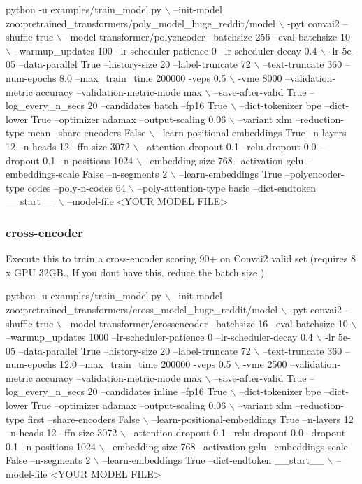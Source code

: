 \begin{DoxyCode}
python -u examples/train\_model.py \(\backslash\)
  --init-model zoo:pretrained\_transformers/poly\_model\_huge\_reddit/model \(\backslash\)
  -pyt convai2 --shuffle true \(\backslash\)
  --model transformer/polyencoder --batchsize 256 --eval-batchsize 10 \(\backslash\)
  --warmup\_updates 100 --lr-scheduler-patience 0 --lr-scheduler-decay 0.4 \(\backslash\)
  -lr 5e-05 --data-parallel True --history-size 20 --label-truncate 72 \(\backslash\)
  --text-truncate 360 --num-epochs 8.0 --max\_train\_time 200000 -veps 0.5 \(\backslash\)
  -vme 8000 --validation-metric accuracy --validation-metric-mode max \(\backslash\)
  --save-after-valid True --log\_every\_n\_secs 20 --candidates batch --fp16 True \(\backslash\)
  --dict-tokenizer bpe --dict-lower True --optimizer adamax --output-scaling 0.06 \(\backslash\)
  --variant xlm --reduction-type mean --share-encoders False \(\backslash\)
  --learn-positional-embeddings True --n-layers 12 --n-heads 12 --ffn-size 3072 \(\backslash\)
  --attention-dropout 0.1 --relu-dropout 0.0 --dropout 0.1 --n-positions 1024 \(\backslash\)
  --embedding-size 768 --activation gelu --embeddings-scale False --n-segments 2 \(\backslash\)
  --learn-embeddings True --polyencoder-type codes --poly-n-codes 64 \(\backslash\)
  --poly-attention-type basic --dict-endtoken \_\_start\_\_ \(\backslash\)
  --model-file <YOUR MODEL FILE>
\end{DoxyCode}


\subsubsection*{cross-\/encoder}

Execute this to train a cross-\/encoder scoring 90+ on Convai2 valid set (requires 8 x G\+PU 32\+GB., If you don\textquotesingle{}t have this, reduce the batch size )


\begin{DoxyCode}
python -u examples/train\_model.py \(\backslash\)
  --init-model zoo:pretrained\_transformers/cross\_model\_huge\_reddit/model \(\backslash\)
  -pyt convai2 --shuffle true \(\backslash\)
  --model transformer/crossencoder --batchsize 16 --eval-batchsize 10 \(\backslash\)
  --warmup\_updates 1000 --lr-scheduler-patience 0 --lr-scheduler-decay 0.4 \(\backslash\)
  -lr 5e-05 --data-parallel True --history-size 20 --label-truncate 72 \(\backslash\)
  --text-truncate 360 --num-epochs 12.0 --max\_train\_time 200000 -veps 0.5 \(\backslash\)
  -vme 2500 --validation-metric accuracy --validation-metric-mode max \(\backslash\)
  --save-after-valid True --log\_every\_n\_secs 20 --candidates inline --fp16 True \(\backslash\)
  --dict-tokenizer bpe --dict-lower True --optimizer adamax --output-scaling 0.06 \(\backslash\)
  --variant xlm --reduction-type first --share-encoders False \(\backslash\)
  --learn-positional-embeddings True --n-layers 12 --n-heads 12 --ffn-size 3072 \(\backslash\)
  --attention-dropout 0.1 --relu-dropout 0.0 --dropout 0.1 --n-positions 1024 \(\backslash\)
  --embedding-size 768 --activation gelu --embeddings-scale False --n-segments 2 \(\backslash\)
  --learn-embeddings True --dict-endtoken \_\_start\_\_ \(\backslash\)
  --model-file <YOUR MODEL FILE>
\end{DoxyCode}
 